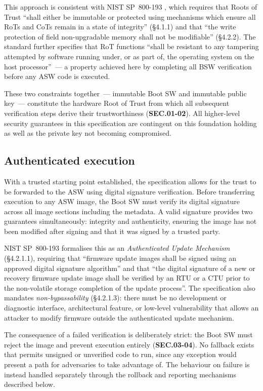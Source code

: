This approach is consistent with NIST SP~800-193 \cite{NIST-sp-800-193}, which requires that Roots of Trust ``shall either be immutable or protected using mechanisms which ensure all RoTs and CoTs remain in a state of integrity'' (§4.1.1) and that ``the write protection of field non-upgradable memory shall not be modifiable'' (§4.2.2). The standard further specifies that RoT functions ``shall be resistant to any tampering attempted by software running under, or as part of, the operating system on the host processor''~--- a property achieved here by completing all BSW verification before any ASW code is executed.

These two constraints together~--- immutable Boot SW and immutable public key~--- constitute the hardware Root of Trust from which all subsequent verification steps derive their trustworthiness (\textbf{SEC.01-02}). All higher-level security guarantees in this specification are contingent on this foundation holding as well as the private key not becoming compromised.

\subsection{Authenticated execution}

With a trusted starting point established, the specification allows for the trust to be forwarded to the ASW using digital signature verification. Before transferring execution to any ASW image, the Boot SW must verify its digital signature across all image sections including the metadata. A valid signature provides two guarantees simultaneously: integrity and authenticity, ensuring the image has not been modified after signing and that it was signed by a trusted party.

NIST SP~800-193 \cite{NIST-sp-800-193} formalises this as an \emph{Authenticated Update Mechanism} (§4.2.1.1), requiring that ``firmware update images shall be signed using an approved digital signature algorithm'' and that ``the digital signature of a new or recovery firmware update image shall be verified by an RTU or a CTU prior to the non-volatile storage completion of the update process''. The specification also mandates \emph{non-bypassability} (§4.2.1.3): there must be no development or diagnostic interface, architectural feature, or low-level vulnerability that allows an attacker to modify firmware outside the authenticated update mechanism.

The consequence of a failed verification is deliberately strict: the Boot SW must reject the image and prevent execution entirely (\textbf{SEC.03-04}). No fallback exists that permits unsigned or unverified code to run, since any exception would present a path for adversaries to take advantage of. The behaviour on failure is instead handled separately through the rollback and reporting mechanisms described below.


